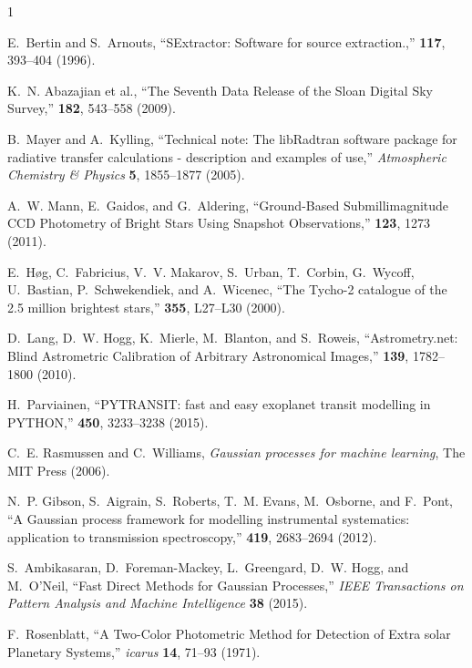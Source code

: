 \documentclass[a4paper,12pt]{spieman}  %
\begin{document}
\begin{spacing}{1}
\begin{thebibliography}{}
E.~{Bertin} and S.~{Arnouts}, ``{SExtractor: Software for source
  extraction.},'' {\em \aaps} {\bf 117}, 393--404  (1996).

K.~N. {Abazajian} et al., ``{The Seventh Data Release of the
  Sloan Digital Sky Survey},'' {\em \apjs} {\bf 182}, 543--558  (2009).

B.~{Mayer} and A.~{Kylling}, ``{Technical note: The libRadtran software package
  for radiative transfer calculations - description and examples of use},''
  {\em Atmospheric Chemistry \& Physics} {\bf 5}, 1855--1877  (2005).

A.~W. {Mann}, E.~{Gaidos}, and G.~{Aldering}, ``{Ground-Based Submillimagnitude
  CCD Photometry of Bright Stars Using Snapshot Observations},'' {\em \pasp}
  {\bf 123}, 1273  (2011).

E.~{H{\o}g}, C.~{Fabricius}, V.~V. {Makarov}, S.~{Urban}, T.~{Corbin},
  G.~{Wycoff}, U.~{Bastian}, P.~{Schwekendiek}, and A.~{Wicenec}, ``{The
  Tycho-2 catalogue of the 2.5 million brightest stars},'' {\em \aap} {\bf
  355}, L27--L30  (2000).

D.~{Lang}, D.~W. {Hogg}, K.~{Mierle}, M.~{Blanton}, and S.~{Roweis},
  ``{Astrometry.net: Blind Astrometric Calibration of Arbitrary Astronomical
  Images},'' {\em \aj} {\bf 139}, 1782--1800  (2010).
  
H.~{Parviainen}, ``{PYTRANSIT: fast and easy exoplanet transit modelling in
  PYTHON},'' {\em \mnras} {\bf 450}, 3233--3238  (2015).  
  
C.~E. Rasmussen and C.~Williams, {\em {Gaussian processes for machine
  learning}}, The MIT Press (2006).

N.~P. {Gibson}, S.~{Aigrain}, S.~{Roberts}, T.~M. {Evans}, M.~{Osborne}, and
  F.~{Pont}, ``{A Gaussian process framework for modelling instrumental
  systematics: application to transmission spectroscopy},'' {\em \mnras} {\bf
  419}, 2683--2694 (2012).

S.~{Ambikasaran}, D.~{Foreman-Mackey}, L.~{Greengard}, D.~W. {Hogg}, and
  M.~{O'Neil}, ``{Fast Direct Methods for Gaussian Processes},'' {\em IEEE
  Transactions on Pattern Analysis and Machine Intelligence} {\bf 38} (2015).

F.~{Rosenblatt}, ``{A Two-Color Photometric Method for Detection of Extra solar
  Planetary Systems},'' {\em icarus} {\bf 14}, 71--93  (1971).


\end{thebibliography}
\end{spacing}
\end{document}
